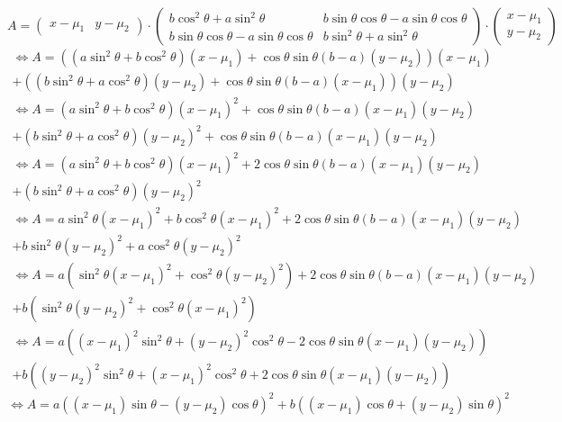 \documentclass{article}
\begin{document}
$$ A=\begin{pmatrix}x-\mu_1 & y-\mu_2 \end{pmatrix}\cdot\begin{pmatrix} b\cos^{2} \theta + a\sin^{2} \theta & b\sin \theta\cos \theta - a\sin \theta\cos \theta \\ b\sin \theta\cos \theta - a\sin \theta\cos \theta & b\sin^{2} \theta + a\sin^{2} \theta\end{pmatrix}\cdot \begin{pmatrix}x-\mu_1 \\ y-\mu_2 \end{pmatrix}$$ 
\begin{multline*} \Leftrightarrow A=((a\sin^2\theta+b\cos^2\theta)(x-\mu_1)+\cos\theta\sin\theta(b-a)(y-\mu_2))(x-\mu_1)\\+((b\sin^2\theta+a\cos^2\theta)(y-\mu_2)+\cos\theta\sin\theta(b-a)(x-\mu_1))(y-\mu_2)\end{multline*}
\begin{multline*} \Leftrightarrow A=(a\sin^2\theta+b\cos^2\theta)(x-\mu_1)^2+\cos\theta\sin\theta(b-a)(x-\mu_1)(y-\mu_2)\\+(b\sin^2\theta+a\cos^2\theta)(y-\mu_2)^2+\cos\theta\sin\theta(b-a)(x-\mu_1)(y-\mu_2)\end{multline*}
\begin{multline*} \Leftrightarrow A=(a\sin^2\theta+b\cos^2\theta)(x-\mu_1)^2+2\cos\theta\sin\theta(b-a)(x-\mu_1)(y-\mu_2)\\+(b\sin^2\theta+a\cos^2\theta)(y-\mu_2)^2\end{multline*}
\begin{multline*} \Leftrightarrow A=a\sin^2\theta(x-\mu_1)^2+b\cos^2\theta(x-\mu_1)^2+2\cos\theta\sin\theta(b-a)(x-\mu_1)(y-\mu_2)\\+b\sin^2\theta(y-\mu_2)^2+a\cos^2\theta(y-\mu_2)^2\end{multline*}
\begin{multline*} \Leftrightarrow A=a(\sin^2\theta(x-\mu_1)^2+\cos^2\theta(y-\mu_2)^2)+2\cos\theta\sin\theta(b-a)(x-\mu_1)(y-\mu_2)\\+b(\sin^2\theta(y-\mu_2)^2+\cos^2\theta(x-\mu_1)^2)\end{multline*}
\begin{multline*} \Leftrightarrow A=a((x-\mu_1)^2\sin^2\theta+(y-\mu_2)^2\cos^2\theta-2\cos\theta\sin\theta(x-\mu_1)(y-\mu_2))\\+b((y-\mu_2)^2\sin^2\theta+(x-\mu_1)^2\cos^2\theta+2\cos\theta\sin\theta(x-\mu_1)(y-\mu_2))\end{multline*}
$$ \Leftrightarrow A=a((x-\mu_1)\sin\theta-(y-\mu_2)\cos\theta)^{2}+b((x-\mu_1)\cos\theta+(y-\mu_2)\sin\theta)^{2}$$
\end{document}

